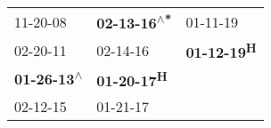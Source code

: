 \begin{supertabular}{lll}
                  11-20-08\textsuperscript{} &  \textbf{02-13-16\textsuperscript{$\wedge$*}} &            01-11-19\textsuperscript{} \\
                  02-20-11\textsuperscript{} &                    02-14-16\textsuperscript{} &  \textbf{01-12-19\textsuperscript{H}} \\
 \textbf{01-26-13\textsuperscript{$\wedge$}} &          \textbf{01-20-17\textsuperscript{H}} &                                       \\
                  02-12-15\textsuperscript{} &                    01-21-17\textsuperscript{} &                                       \\
\end{supertabular}
